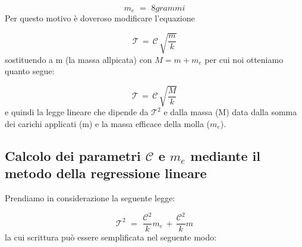 \begin{equation*}
	m_e \,\,=\,\, 8 grammi
\end{equation*}
%
Per questo motivo è doveroso modificare l'equazione

\begin{equation*}
	\mathcal{T} \,=\, \mathcal{C} \, \sqrt{\frac{m}{k}}
\end{equation*}
%
sostituendo a m (la massa allpicata) con $M = m + m_e$ per cui noi otteniamo quanto segue:

\begin{equation*}
	\mathcal{T} \,=\, \mathcal{C} \, \sqrt{\frac{M}{k}}
\end{equation*}
%
e quindi la legge lineare che dipende da $\mathcal{T}^2$ e dalla massa (M) data dalla somma dei carichi applicati (m) e la massa efficace della molla ($m_e$).

\subsection{Calcolo dei parametri $\mathcal{C}$ e $m_e$ mediante il metodo della regressione lineare}
Prendiamo in considerazione la seguente legge:

\begin{equation*}
	\mathcal{T}^2 \,\,=\,\, \frac{\mathcal{C}^2}{k} m_e \,+\, \frac{\mathcal{C}^2}{k} m
\end{equation*}
%
la cui scrittura può essere semplificata nel seguente modo:

